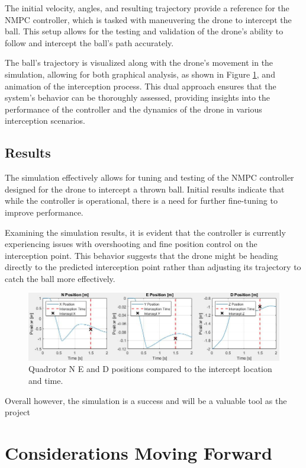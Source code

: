 \documentclass{UoNMCHA}
\numberwithin{equation}{section}
\begin{document}
The initial velocity, angles, and resulting trajectory provide a reference for the NMPC controller, which is tasked with maneuvering the drone to intercept the ball. This setup allows for the testing and validation of the drone's ability to follow and intercept the ball's path accurately.

The ball's trajectory is visualized along with the drone's movement in the simulation, allowing for both graphical analysis, as shown in Figure \ref{fig:simResults}, and animation of the interception process. This dual approach ensures that the system's behavior can be thoroughly assessed, providing insights into the performance of the controller and the dynamics of the drone in various interception scenarios.


\subsection{Results}
The simulation effectively allows for tuning and testing of the NMPC controller designed for the drone to intercept a thrown ball. Initial results indicate that while the controller is operational, there is a need for further fine-tuning to improve performance.

Examining the simulation results, it is evident that the controller is currently experiencing issues with overshooting and fine position control on the interception point. This behavior suggests that the drone might be heading directly to the predicted interception point rather than adjusting its trajectory to catch the ball more effectively.

\begin{figure}[H]
    \centering
    \includegraphics[width=1\linewidth]{Figures/SimResults.JPG}
    \caption{Quadrotor N E and D positions compared to the intercept location and time.}
    \label{fig:simResults} %
\end{figure}

Overall however, the simulation is a success and will be a valuable tool as the project 

\section{Considerations Moving Forward}
\end{document}
